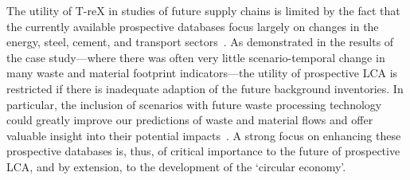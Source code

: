 The utility of T-reX in studies of future supply chains is limited by the fact that the currently available prospective databases focus largely on changes in the energy, steel, cement, and transport sectors~\citep{sacchi2023premisedocs}. As demonstrated in the results of the case study---where there was often very little scenario-temporal change in many waste and material footprint indicators---the utility of prospective LCA is restricted if there is inadequate adaption of the future background inventories. In particular, the inclusion of scenarios with future waste processing technology could greatly improve our predictions of waste and material flows and offer valuable insight into their potential impacts~\citep{bisinella2024wastelca}. A strong focus on enhancing these prospective databases is, thus, of critical importance to the future of prospective LCA, and by extension, to the development of the `circular economy'. 
